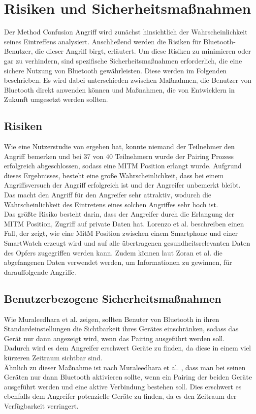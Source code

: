 \documentclass[
    a4paper,
    pagesize,
    pdftex,
    12pt,
]{scrartcl}
\begin{document}
    \newpage
    \section{Risiken und Sicherheitsmaßnahmen}
    Der Method Confusion Angriff wird zunächst hinsichtlich der Wahrscheinlichkeit seines Eintreffens analysiert. Anschließend werden die Risiken für Bluetooth-Benutzer, die dieser Angriff birgt, erläutert.
    Um diese Risiken zu minimieren oder gar zu verhindern, sind spezifische Sicherheitsmaßnahmen erforderlich, die eine sichere Nutzung von Bluetooth gewährleisten. Diese werden im Folgenden beschrieben. Es wird dabei unterschieden zwischen Maßnahmen, die Benutzer von Bluetooth direkt anwenden können und Maßnahmen, die von Entwicklern in Zukunft umgesetzt werden sollten.

   \subsection{Risiken}
   Wie eine Nutzerstudie von \cite{method_confusion_attack} ergeben hat, konnte niemand der Teilnehmer den Angriff bemerken und bei 37 von 40 Teilnehmern wurde der Pairing Prozess erfolgreich abgeschlossen, sodass eine MITM Position erlangt wurde. Aufgrund dieses Ergebnisses, besteht eine große Wahrscheinlichkeit, dass bei einem Angriffsversuch der Angriff erfolgreich ist und der Angreifer unbemerkt bleibt. Das macht den Angriff für den Angreifer sehr attraktiv, wodurch die Wahrscheinlichkeit des Eintretens eines solchen Angriffes sehr hoch ist. \\
   Das größte Risiko besteht darin, dass der Angreifer durch die Erlangung der MITM Position, Zugriff auf private Daten hat. Lorenzo et al. \cite{technologies7010015} beschreiben einen Fall, der zeigt, wie eine MitM Position zwischen einem Smartphone und einer SmartWatch erzeugt wird und auf alle übertragenen gesundheitsrelevanten Daten des Opfers zugegriffen werden kann. Zudem können laut Zoran et al. \cite{weitere_risiken} die abgefangenen Daten verwendet werden, um Informationen zu gewinnen, für darauffolgende Angriffe.
   
\subsection{Benutzerbezogene Sicherheitsmaßnahmen}
    Wie Muraleedhara et al. \cite{bluetooth_newest_security_risks} zeigen, sollten Benuter von Bluetooth in ihren Standardeinstellungen die Sichtbarkeit ihres Gerätes einschränken, sodass das Gerät nur dann angezeigt wird, wenn das Pairing ausgeführt werden soll. Dadurch wird es dem Angreifer erschwert Geräte zu finden, da diese in einem viel kürzeren Zeitraum sichtbar sind. \\
    Ähnlich zu dieser Maßnahme ist nach Muraleedhara et al. \cite{bluetooth_newest_security_risks}, dass man bei seinen Geräten nur dann Bluetooth aktivieren sollte, wenn ein Pairing der beiden Geräte ausgeführt werden und eine aktive Verbindung bestehen soll. Dies erschwert es ebenfalls dem Angreifer potenzielle Geräte zu finden, da es den Zeitraum der Verfügbarkeit verringert.
\end{document}
